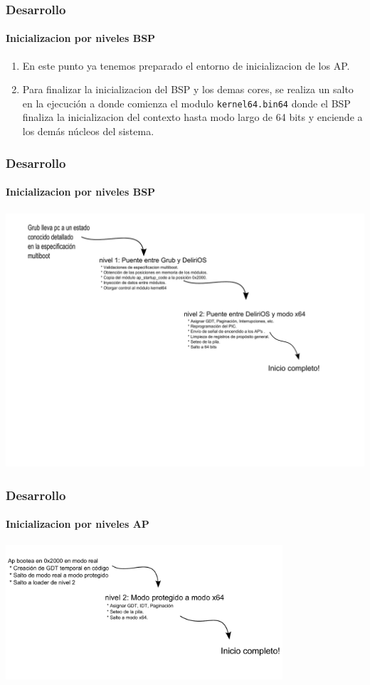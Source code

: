 \documentclass{beamer}
\begin{document}
\begin{frame}
  \frametitle{Desarrollo}
  \framesubtitle{Inicializacion por niveles BSP}
    \begin{enumerate}
      \item En este punto ya tenemos preparado el entorno de inicializacion de los AP.
      \pause
      \item Para finalizar la inicializacion del BSP y los demas cores, se realiza un salto en la ejecución a donde comienza el modulo \texttt{kernel64.bin64} donde el BSP finaliza la inicializacion del contexto hasta modo largo de 64 bits y enciende a los demás núcleos del sistema.
    \end{enumerate}
\end{frame}

\begin{frame}
  \frametitle{Desarrollo}
  \framesubtitle{Inicializacion por niveles BSP}
  \begin{center}
  \includegraphics[height=9.5cm]{images/bsp-stages-diagram.pdf} 
  \end{center}
\end{frame}

\begin{frame}
  \frametitle{Desarrollo}
  \framesubtitle{Inicializacion por niveles AP}
  \begin{center}
  \includegraphics[height=5cm]{images/ap-stages-diagram.pdf} 
  \end{center}
\end{frame}
\end{document}
